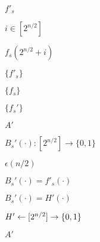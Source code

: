 \documentclass[10pt]{book}
\begin{document}
\begin{mdSnippets}
\begin{mdInlineSnippet}%
$f'_s$\end{mdInlineSnippet}%
\begin{mdInlineSnippet}%
$i\in [2^{n/2}]$\end{mdInlineSnippet}%
\begin{mdInlineSnippet}[90b3ea3fe17b22e2109c293ea93e589d]%
$f_s(2^{n/2}+i)$\end{mdInlineSnippet}%
\begin{mdInlineSnippet}[d2a9c8322690fce87499dd560ac2f432]%
$\{ f'_s \}$\end{mdInlineSnippet}%
\begin{mdInlineSnippet}[f0a0745b39ca7c74b201f7784e766521]%
$\{f_s\}$\end{mdInlineSnippet}%
\begin{mdInlineSnippet}%
$\{f_s'\}$\end{mdInlineSnippet}%
\begin{mdInlineSnippet}[37a12b78a9ca96989ad7ceceacb37ea2]%
$A'$\end{mdInlineSnippet}%
\begin{mdInlineSnippet}[265ce11f27fb52d5176acadf51158025]%
$B_s'(\cdot): [2^{n/2}] \to \{0,1\}$\end{mdInlineSnippet}%
\begin{mdInlineSnippet}[1e746f6ba10fd5c2b4c68c6fcf735c18]%
$\epsilon(n/2)$\end{mdInlineSnippet}%
\begin{mdInlineSnippet}[5617967635776ff82d1e1ec743a2ec01]%
$B_s'(\cdot) = f'_s(\cdot)$\end{mdInlineSnippet}%
\begin{mdInlineSnippet}%
$B_s'(\cdot) = H'(\cdot)$\end{mdInlineSnippet}%
\begin{mdInlineSnippet}%
$H' \gets [2^{n/2}] \to \{0,1\}$\end{mdInlineSnippet}%
\begin{mdInlineSnippet}[37a12b78a9ca96989ad7ceceacb37ea2]%
$A'$\end{mdInlineSnippet}%

\end{mdSnippets}
\end{document}
